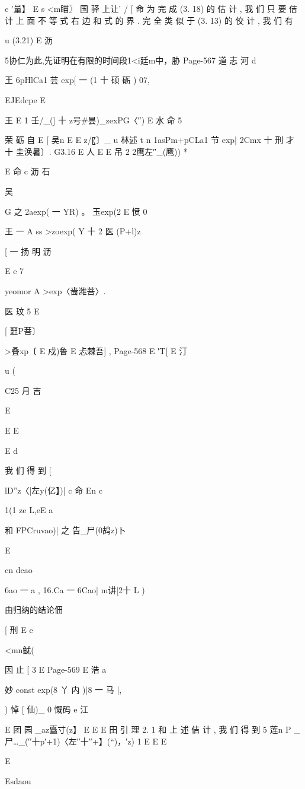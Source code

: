 {{c '量】 E
s <m瞄〗 国 驿 上让'
/ [ 命
为 完 成 (3. 18) 的 估 计 , 我 们 只 要 佶 计 上 面 不 等 式 右 边 和 式 的
界 . 完 全 类 似 于 (3. 13) 的 佼 计 , 我 们 有

u (3.21)
E 沥

5协仁为此,先证明在有限的时间段1<i廷m中，胁
Page-567
道 志 河 d

王
6pHlCa1 芸 exp[ 一 (1 十 硕 砺 ) 07,

EJEdcpe
E

王
E 1 壬/_(] 十 z号#昙)_zexPG〈″) E 水
命 5

荣 砺 自
E [ 吴n
E E z/〖〕_
u 林述 t n
1asPm+pCLa1 节 exp| 2Cmx 十 刑 才 十 圭涣暑〕. G3.16
E 人
E E 吊 2 2鹰左″_(鹰)) *

E 命 c 沥 石

吴

G
之 2aexp( 一 YR) 。 玉exp(2 E 愤 0

王 一 A ss
>zoexp( Y 十 2 医 (P+l)z

[ 一 扬 明 沥

E
e 7

yeomor A >exp〈啬潍菩〉.

医 玟 5
E

[ 噩P菩〕

>叠xp〔 E 戍)鲁 E 忐棘吾] ,
Page-568
E
′T[ E 汀

u (

C25 月 吉

E

E
E

E
d

我 们 得 到
[

lD”z〈|左y(亿】)| c 命 En c

1(1 ze L,eE a

和
FPCruvao)| 之 告_尸(0鸪z)卜

E

cn
dcao

6ao 一 a , 16.Ca 一 6Cao|
m讲[2十 L )

由归纳的结论佃%

[ 刑
E e

<mn鱿(

因 止
[ 3
E
Page-569
E 浩 a

妙 const exp(8 丫 内 )|8 一 马 |,

) 悼 [ 仙)_
0 慨码 e
江

E
团 园
_az矗寸(z】 E
E
E
田 引 理 2. 1 和 上 述 佶 计 , 我 们 得 到
5 莲n
P _尸…_(′′十p′+1)〈左′′十′′+】(“)，′z) 1
E
E
E

E

Esdaou

}}
